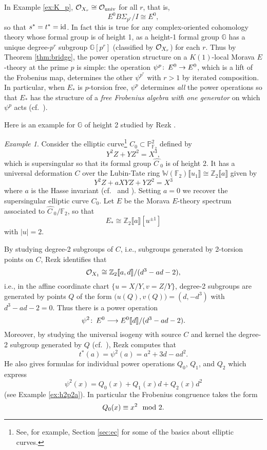 \documentclass{gtpart}
\theoremstyle{definition}
\theoremstyle{remark}
\newtheorem{ex}[thm]{Example}
\def\co{\colon\thinspace}
\newcommand{\mb}[1]{\mathbb{#1}}
\newcommand{\CO}{{\cal O}}
\newcommand{\BF}{{\mb F}}
\newcommand{\BG}{{\mb G}}
\newcommand{\BP}{{\mb P}}
\newcommand{\BW}{{\mb W}}
\newcommand{\BZ}{{\mb Z}}
\newcommand{\HC}{\widehat{C~}\!}
\newcommand{\md}{~~{\rm mod}~}
\newcommand{\id}{{\rm id}}
\newcommand{\univ}{{\rm univ}}
\numberwithin{equation}{section}
\numberwithin{thm}{section}
\begin{document}
In Example \ref{ex:K_p}, $\CO_{X_r} \cong \CO_\univ$ for all $r$, that 
is, 
\[
 E^0 B\Sigma_{p^r}/I \cong E^0, 
\]
so that $s^* = t^* = \id$.  In fact this is true for any 
complex-oriented cohomology theory whose formal group is of height 1, as 
a height-1 formal group $\BG$ has a unique degree-$p^r$ subgroup 
$\BG [p^r]$ (classified by $\CO_{X_r}$) for each $r$.  Thus by Theorem 
\ref{thm:bridge}, the power operation structure on a $K(1)$-local Morava 
$E$-theory at the prime $p$ is simple: the operation 
$\psi^p \co E^0 \to E^0$, which is a lift of the Frobenius map, 
determines the other $\psi^{p^r}$ with $r>1$ by iterated composition.  
In particular, when $E_*$ is $p$-torsion free, $\psi^p$ determines 
{\em all} the power operations so that $E_*$ has the structure of a 
{\em free Frobenius algebra with one generator} on which $\psi^p$ acts 
(cf.~\cite[Section 4]{hopkins}).  

Here is an example for $\BG$ of height 2 studied by Rezk \cite{h2p2}.  

\begin{ex}
\label{ex:h2p2b}
 Consider the elliptic curve\footnote{See, for example, Section 
 \ref{sec:ec} for some of the basics about elliptic curves.  } 
 $C_0 \subset \BP_{\BF_2}^2$ defined by 
 \[
  Y^2 Z + Y Z^2 = X^3, 
 \]
 which is supersingular so that its formal group $\HC_0$ is of height 2.  
 It has a universal deformation $C$ over the Lubin-Tate ring 
 $\BW(\BF_2) \llbracket u_1 \rrbracket \cong 
 \BZ_2 \llbracket a \rrbracket$ given by 
 \[
  Y^2 Z + a X Y Z + Y Z^2 = X^3 
 \]
 where $a$ is the Hasse invariant (cf.~\cite[Proposition 3.2]{tmf3} and 
 \cite[2.2.10]{KM}).  Setting $a=0$ we recover the supersingular 
 elliptic curve $C_0$.  Let $E$ be the Morava $E$-theory spectrum 
 associated to $\HC_0/\BF_2$, so that 
 \[
  E_* \cong \BZ_2 \llbracket a \rrbracket [u^{\pm 1}] 
 \]
 with $|u| = 2$.  

 By studying degree-2 subgroups of $C$, i.e., subgroups generated by 
 2-torsion points on $C$, Rezk identifies that 
 \[
  \CO_{X_1} \cong \BZ_2 \llbracket a, d \rrbracket / (d^3 - a d - 2), 
 \]
 i.e., in the affine coordinate chart $\{u = X/Y, v = Z/Y\}$, degree-2 
 subgroups are generated by points $Q$ of the form 
 $\big( u(Q), v(Q) \big) = (d, -d^3)$ with $d^3 - a d - 2 = 0$.  Thus 
 there is a power operation 
 \[
  \psi^2 \co E^0 \longrightarrow E^0 \llbracket d \rrbracket / 
  (d^3 - a d - 2).  
 \]
 Moreover, by studying the universal isogeny with source $C$ and kernel 
 the degree-2 subgroup generated by $Q$ (cf.~\cite[Theorem 1.4]{lubin}), 
 Rezk computes that 
 \[
  t^* (a) = \psi^2 (a) = a^2 + 3 d - a d^2.  
 \]
 He also gives formulas for individual power operations $Q_0$, $Q_1$, 
 and $Q_2$ which express 
 \[
  \psi^2 (x) = Q_0(x) + Q_1(x) d + Q_2(x) d^2 
 \]
 (see Example \ref{ex:h2p2a}).  In particular the Frobenius congruence 
 takes the form 
 \[
  Q_0(x) \equiv x^2 \md 2.  
 \]
\end{ex}
\end{document}
